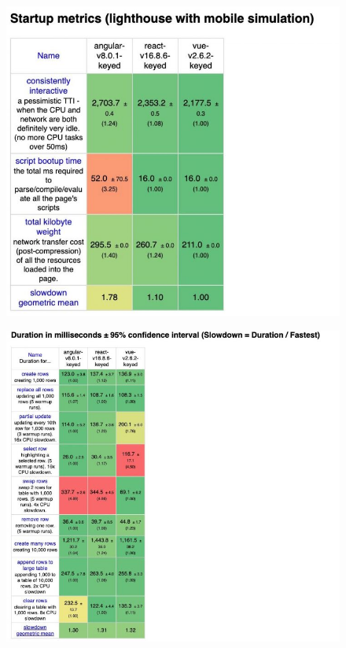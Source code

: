 \documentclass[12pt]{report}
\begin{document}
\begin{figure}[h]
\includegraphics[width=\textwidth]{startup-time-comparison}
\end{figure}
\begin{figure}[h]
\includegraphics[width=\textwidth]{dom-manipulation-comparison}
\end{figure}
\end{document}
